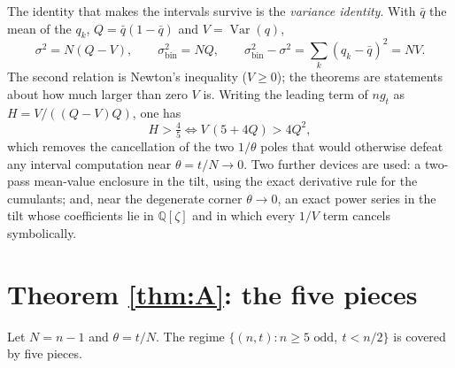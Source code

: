 \documentclass[12pt]{article}
\newcommand{\Qq}{\mathbb{Q}}
\DeclareMathOperator{\Var}{Var}
\begin{document}
The identity that makes the intervals survive is the \emph{variance identity}. With $\bar q$ the mean of the $q_k$, $Q = \bar q(1-\bar q)$ and $V = \Var(q)$,
\begin{equation}\label{eq:variance}
\sigma^2 = N(Q - V), \qquad \sigma_{\mathrm{bin}}^2 = N Q, \qquad \sigma_{\mathrm{bin}}^2 - \sigma^2 = \sum_k (q_k-\bar q)^2 = N V .
\end{equation}
The second relation is Newton's inequality ($V\ge0$); the theorems are statements about how much larger than zero $V$ is. Writing the leading term of $n g_t$ as $H = V/((Q-V)Q)$, one has
\begin{equation}\label{eq:H45}
H > \tfrac45 \iff V\,(5+4Q) > 4Q^2 ,
\end{equation}
which removes the cancellation of the two $1/\theta$ poles that would otherwise defeat any interval computation near $\theta = t/N \to 0$. Two further devices are used: a two-pass mean-value enclosure in the tilt, using the exact derivative rule for the cumulants; and, near the degenerate corner $\theta\to0$, an exact power series in the tilt whose coefficients lie in $\Qq[\zeta]$ and in which every $1/V$ term cancels symbolically.

\section{Theorem \ref{thm:A}: the five pieces}\label{sec:A}

Let $N = n-1$ and $\theta = t/N$. The regime $\{(n,t): n\ge5 \text{ odd},\ t<n/2\}$ is covered by five pieces.
\end{document}

